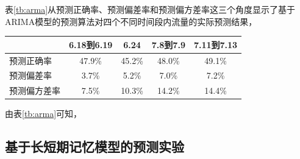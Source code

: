 表\ref{tb:arma}从预测正确率、预测偏差率和预测偏方差率这三个角度显示了基于ARIMA模型的预测算法对四个不同时间段内流量的实际预测结果，
\begin{table}[h]
\centering
{}
\begin{tabular}{@{}lcccc@{}}\toprule
  & 6.18到6.19 & 6.24 & 7.8到7.9 & 7.11到7.13 \\ \midrule
 预测正确率 & 47.9\% & 45.2\% & 48.0\% & 49.1\% \\
 预测偏差率 & 3.7\% & 5.2\% & 7.0\% & 7.2\% \\
 预测偏方差率 & 7.5\% & 10.3\% & 14.2\% & 14.4\% \\ \bottomrule
\end{tabular}
\end{table}
由表\ref{tb:arma}可知，


\subsection{基于长短期记忆模型的预测实验}\label{sec:lstm_eval}


